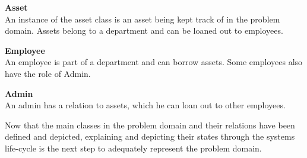 
\textbf{Asset}\\
An instance of the asset class is an asset being kept track of in the problem domain. Assets belong to a department and can be loaned out to employees.
\par

\textbf{Employee} \\
An employee is part of a department and can borrow assets. Some employees also have the role of Admin.
\par

\textbf{Admin} \\
An admin has a relation to assets, which he can loan out to other employees.
\par
Now that the main classes in the problem domain and their relations have been defined and depicted, explaining and depicting their states through the systems life-cycle is the next step to adequately represent the problem domain.

